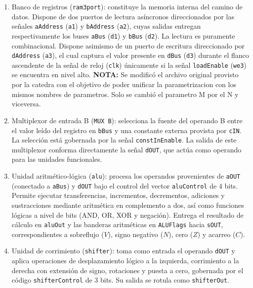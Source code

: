 \begin{enumerate}
  \item Banco de registros (\texttt{ram3port}): constituye la memoria interna del camino de datos. Dispone de dos
        puertos de lectura asíncronos direccionados por las señales \texttt{aAddress} (\texttt{a1}) y \texttt{bAddress}
        (\texttt{a2}), cuyas salidas entregan respectivamente los buses \texttt{aBus} (\texttt{d1}) y \texttt{bBus}
        (\texttt{d2}). La lectura es puramente combinacional. Dispone asimismo de un puerto de escritura direccionado
        por \texttt{dAddress} (\texttt{a3}), el cual captura el valor presente en \texttt{dBus} (\texttt{d3}) durante el
        flanco ascendente de la señal de reloj (\texttt{clk}) únicamente si la señal \texttt{loadEnable} (\texttt{we3})
        se encuentra en nivel alto. \textbf{NOTA:} Se modificó el archivo original provisto por la catedra con el
        objetivo de poder unificar la parametrizacion con los mismos nombres de parametros. Solo se cambió el parametro
        M por el N y viceversa.
  \item Multiplexor de entrada B (\texttt{MUX B}): selecciona la fuente del operando B entre el valor leído del registro
        en \texttt{bBus} y una constante externa provista por \texttt{cIN}. La selección está gobernada por la señal
        \texttt{constInEnable}. La salida de este multiplexor conforma directamente la señal \texttt{dOUT}, que actúa
        como operando para las unidades funcionales.
  \item Unidad aritmético-lógica (\texttt{alu}): procesa los operandos provenientes de \texttt{aOUT} (conectado a
        \texttt{aBus}) y \texttt{dOUT} bajo el control del vector \texttt{aluControl} de 4 bits. Permite ejecutar
        transferencias, incrementos, decrementos, adiciones y sustracciones mediante aritmética en complemento a dos,
        así como funciones lógicas a nivel de bits (AND, OR, XOR y negación). Entrega el resultado de cálculo en
        \texttt{aluOut} y las banderas aritméticas en \texttt{ALUFlags} hacia \texttt{sOUT}, correspondientes a sobreflujo
        ($V$), signo negativo ($N$), cero ($Z$) y acarreo ($C$).
  \item Unidad de corrimiento (\texttt{shifter}): toma como entrada el operando \texttt{dOUT} y aplica operaciones de
        desplazamiento lógico a la izquierda, corrimiento a la derecha con extensión de signo, rotaciones y puesta a cero,
        gobernada por el código \texttt{shifterControl} de 3 bits. Su salida se rotula como \texttt{shifterOut}.

\end{enumerate}

